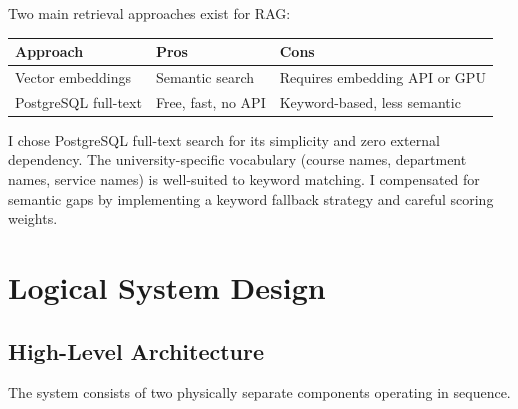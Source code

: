 \documentclass[12pt,a4paper]{report}
\begin{document}
Two main retrieval approaches exist for RAG:

\begin{center}
\begin{tabular}{lll}
\toprule
\textbf{Approach} & \textbf{Pros} & \textbf{Cons} \\
\midrule
Vector embeddings & Semantic search & Requires embedding API or GPU \\
PostgreSQL full-text & Free, fast, no API & Keyword-based, less semantic \\
\bottomrule
\end{tabular}
\end{center}

I chose PostgreSQL full-text search for its simplicity and zero external dependency. The university-specific vocabulary (course names, department names, service names) is well-suited to keyword matching. I compensated for semantic gaps by implementing a keyword fallback strategy and careful scoring weights.

\chapter{Logical System Design}

\section{High-Level Architecture}

The system consists of two physically separate components operating in sequence.
\end{document}
